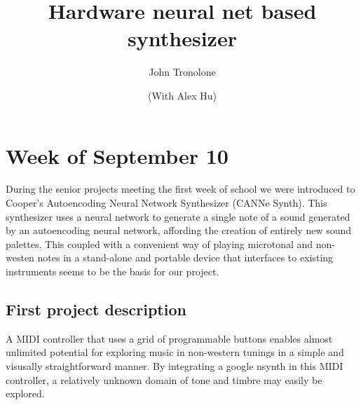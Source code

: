 \documentclass{article}
\begin{document}
\title{Hardware neural net based synthesizer}
\author{John Tronolone\and (With Alex Hu)}
\date{}

\maketitle



\section{Week of September 10}

During the senior projects meeting the first week of school we were introduced to Cooper's Autoencoding Neural Network Synthesizer (CANNe Synth). This synthesizer uses a neural network to generate a single note of a sound generated by an autoencoding neural network, affording the creation of entirely new sound palettes. This coupled with a convenient way of playing microtonal and non-westen notes in a stand-alone and portable device that interfaces to existing instruments seems to be the basis for our project.

\subsection{First project description}

A MIDI controller that uses a grid of programmable buttons enables almost unlimited potential for exploring music in non-western tunings in a simple and visusally straightforward manner. By integrating a google nsynth in this MIDI controller, a relatively unknown domain of tone and timbre may easily be explored.
\end{document}
